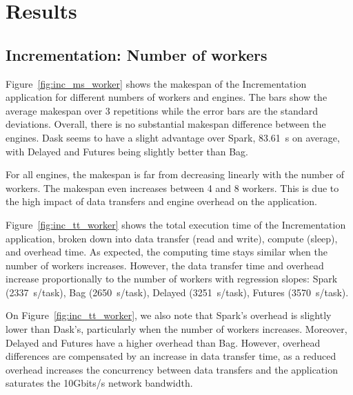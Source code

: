 \documentclass[conference]{IEEEtran}
\begin{document}
\section{Results}

\subsection{Incrementation: Number of workers}
Figure~\ref{fig:inc_ms_worker} shows the makespan of the Incrementation application
for different numbers of workers and engines. The bars show the average
makespan over 3 repetitions while the error bars are the standard deviations. Overall,
there is no substantial makespan difference between the engines. Dask seems to have a
slight advantage over Spark, \SI{83.61}{\second} on average,
with Delayed and Futures being slightly better than Bag.

For all engines, the makespan is far from decreasing linearly with the
number of workers. The makespan
even increases between 4 and 8 workers. This is due to the high impact of
data transfers and engine overhead on the application. 

Figure~\ref{fig:inc_tt_worker} shows the total execution time of the
Incrementation application, broken down into data transfer (read and
write), compute (sleep), and overhead time. As expected, the computing time
stays similar when the number of workers increases. However, the data
transfer time and overhead increase proportionally to the number of
workers with regression slopes: Spark (\SI{2337}{\second/task}), Bag
(\SI{2650}{\second/task}), Delayed (\SI{3251}{\second/task}), Futures
(\SI{3570}{\second/task}).

On Figure~\ref{fig:inc_tt_worker}, we also note that Spark's overhead is
slightly lower than Dask's, particularly when the number of workers
increases. Moreover, Delayed and Futures have a higher overhead than Bag.
However, overhead differences are compensated by an increase in data
transfer time, as a reduced overhead increases the concurrency between data
transfers and the application saturates the 10Gbits/s network bandwidth. 
\end{document}
